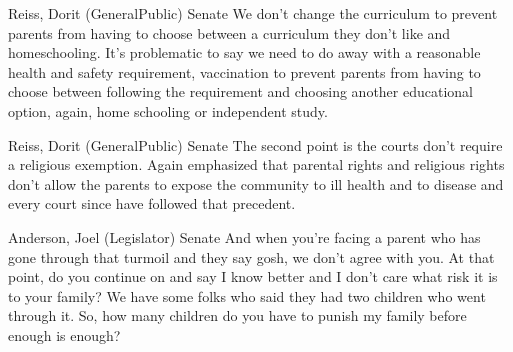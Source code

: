 \begin{result}{7.032216048716612}{Reiss, Dorit (GeneralPublic) Senate}
We don't change the curriculum to prevent parents from having to choose between a curriculum they don't like and homeschooling. It's problematic to say we need to do away with a reasonable health and safety requirement, vaccination to prevent parents from having to choose between following the requirement and choosing another educational option, again, home schooling or independent study.
\end{result}

\begin{result}{6.846770329405164}{Reiss, Dorit (GeneralPublic) Senate}
The second point is the courts don't require a religious exemption. Again emphasized that parental rights and religious rights don't allow the parents to expose the community to ill health and to disease and every court since have followed that precedent.
\end{result}

\begin{result}{6.547916404088606}{Anderson, Joel (Legislator) Senate}
And when you're facing a parent who has gone through that turmoil and they say gosh, we don't agree with you. At that point, do you continue on and say I know better and I don't care what risk it is to your family? We have some folks who said they had two children who went through it. So, how many children do you have to punish my family before enough is enough?
\end{result}

